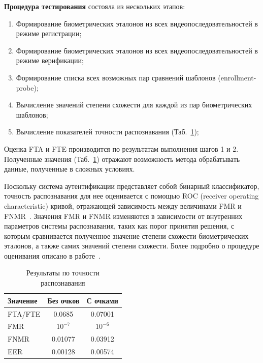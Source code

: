 {\bf Процедура тестирования} состояла из нескольких этапов:
\begin{enumerate}
	\setlength\itemsep{0.01em}
	\item Формирование биометрических эталонов из всех видеопоследовательностей в режиме регистрации;
	\item Формирование биометрических эталонов из всех видеопоследовательностей в режиме верификации;
	\item Формирование списка всех возможных пар сравнений шаблонов (enrollment-probe);
	\item Вычисление значений степени схожести для каждой из пар биометрических шаблонов;
	\item Вычисление показателей точности распознавания (Таб.~\ref{tab:accuracy_results});
\end{enumerate}

Оценка FTA и FTE производится по результатам выполнения шагов 1 и 2. Полученные значения (Таб.~\ref{tab:accuracy_results}) отражают возможность метода обрабатывать данные, полученные в сложных условиях.

Поскольку система аутентификации представляет собой бинарный классификатор, точность распознавания для нее оценивается с помощью ROC (receiver operating characteristic) кривой, отражающей зависимость между величинами FMR и FNMR~\cite{enc_biometrics}. Значения FMR и FNMR изменяются в зависимости от внутренних параметров системы распознавания, таких как порог принятия решения, с которым сравнивается полученное значение степени схожести биометрических эталонов, а также самих значений степени схожести. Более подробно о процедуре оценивания описано в работе~\cite{odinokikh_hprec_2018}.


\begin{table}[h]
	\begin{center}
		\small
		\begin{tabular}{|l|c|c|}
			\hline
			Значение	& Без очков   	& С очками\\
			\hline
			FTA/FTE		& 0.0685        & 0.07001 \\
			FMR			& $10^{-7}$     & $10^{-6}$ \\
			FNMR		& 0.01077       & 0.03912 \\
			EER			& 0.00128       & 0.00574 \\
			\hline
		\end{tabular}
	\end{center}
	\caption{Результаты по точности распознавания}
	\label{tab:accuracy_results}
\end{table}

